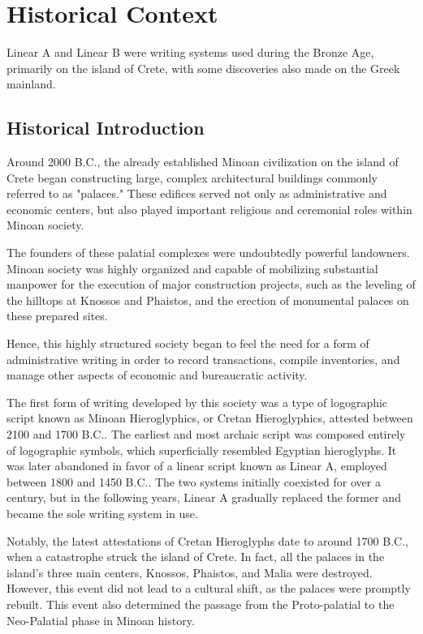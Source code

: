 \chapter{Historical Context}
Linear A and Linear B were writing systems used during the Bronze Age, primarily on the island of Crete, with some discoveries also made on the Greek mainland.

\section{Historical Introduction}
Around 2000 B.C., the already established Minoan civilization on the island of Crete began constructing large, complex architectural buildings commonly referred to as "palaces."
These edifices served not only as administrative and economic centers, but also played important religious and ceremonial roles within Minoan society.

The founders of these palatial complexes were undoubtedly powerful landowners.
Minoan society was highly organized and capable of mobilizing substantial manpower for the execution of major construction projects, such as the leveling of the hilltops at Knossos and Phaistos, and the erection of monumental palaces on these prepared sites. \cite{alexiou-ch2}

Hence, this highly structured society began to feel the need for a form of administrative writing in order to record transactions, compile inventories, and manage other aspects of economic and bureaucratic activity.

The first form of writing developed by this society was a type of logographic script known as Minoan Hieroglyphics, or Cretan Hieroglyphics, attested between 2100 and 1700 B.C..
The earliest and most archaic script was composed entirely of logographic symbols, which superficially resembled Egyptian hieroglyphs.
It was later abandoned in favor of a linear script known as Linear A, employed between 1800 and 1450 B.C..
The two systems initially coexisted for over a century, but in the following years, Linear A gradually replaced the former and became the sole writing system in use. \cite{salg-ch1}

Notably, the latest attestations of Cretan Hieroglyphs date to around 1700 B.C., when a catastrophe struck the island of Crete.
In fact, all the palaces in the island’s three main centers, Knossos, Phaistos, and Malia were destroyed.
However, this event did not lead to a cultural shift, as the palaces were promptly rebuilt.
This event also determined the passage from the Proto-palatial to the Neo-Palatial phase in Minoan history. \cite{alexiou-ch3}

